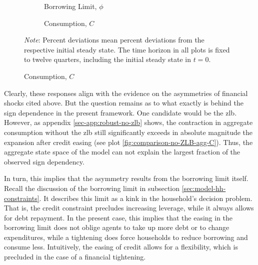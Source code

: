 \documentclass[a4paper,12pt]{article} %
\numberwithin{equation}{section} %
\numberwithin{figure}{section}
\numberwithin{table}{section}
\begin{document}
\begin{figure}[t]
    \caption{Baseline -- Shock to the Borrowing Limit: Asymmetry}
    \label{fig:comparison-asymmetry}
    \centering
    \begin{subfigure}[b]{0.49\textwidth}
    \caption{Borrowing Limit, $\phi$}
    \label{fig:comparison-asymmetry-phi}
         \centering
         
     \end{subfigure}
    \hfill
    \begin{subfigure}[b]{0.49\textwidth}
    \caption{Consumption, $C$}
    \label{fig:comparison-asymmetry-C}
         \centering
         
     \end{subfigure}
     
     \vspace{10pt}
     
     \justifying
     \footnotesize
	\textit{Note}: Percent deviations mean percent deviations from the respective initial steady state. The time horizon in all plots is fixed to twelve quarters, including the initial steady state in $t=0$.
\end{figure}

Clearly, these responses align with the evidence on the asymmetries of financial shocks cited above. But the question remains as to what exactly is behind the sign dependence in the present framework. One candidate would be the \Gls{zlb}. However, as appendix \ref{sec-app:robust-no-zlb} shows, the contraction in aggregate consumption without the \Gls{zlb} still significantly exceeds in absolute magnitude the expansion after credit easing (see plot \ref{fig:comparison-no-ZLB-agg-C}). Thus, the aggregate state space of the model can not explain the largest fraction of the observed sign dependency.

In turn, this implies that the asymmetry results from the borrowing limit itself. Recall the discussion of the borrowing limit in subsection \ref{sec:model-hh-constraints}. It describes this limit as a kink in the household's decision problem. That is, the credit constraint precludes increasing leverage, while it always allows for debt repayment. In the present case, this implies that the easing in the borrowing limit does not oblige agents to take up more debt or to change expenditures, while a tightening does force households to reduce borrowing and consume less. Intuitively, the easing of credit allows for a flexibility, which is precluded in the case of a financial tightening. 
\end{document}
